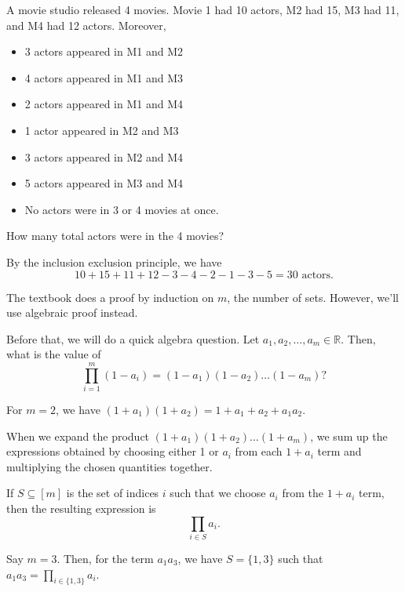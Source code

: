 
\begin{eg}
	A movie studio released 4 movies. Movie 1 had 10 actors, M2 had 15, M3 had 11, and M4 had 12 actors. Moreover, 
	\begin{itemize}
		\item 3 actors appeared in M1 and M2
		\item 4 actors appeared in M1 and M3
		\item 2 actors appeared in M1 and M4
		\item 1 actor appeared in M2 and M3
		\item 3 actors appeared in M2 and M4
		\item 5 actors appeared in M3 and M4
		\item No actors were in 3 or 4 movies at once.
	\end{itemize}
	How many total actors were in the 4 movies?\\
\end{eg}

By the inclusion exclusion principle, we have \[
	10 + 15 + 11 + 12 - 3 - 4 - 2 - 1 - 3 - 5 = 30 \text{ actors}
.\] 

\begin{note}
	The textbook does a proof by induction on \( m \), the number of sets. However, we'll use algebraic proof instead.
\end{note}

Before that, we will do a quick algebra question. Let \( a_{1},a_{2},\ldots ,a_m \in \mathbb{R} \). Then, what is the value of \[
	\prod_{i=1}^{m} (1 - a_{i}) = (1 - a_{1})(1 - a_{2})\ldots (1 - a_{m})
?\]

\begin{eg}
	For \( m=2 \), we have \( (1+a_{1})(1+a_{2})=1+a_{1}+a_{2}+a_{1}a_{2} \).
\end{eg}

When we expand the product \( (1+a_{1})(1+a_{2})\ldots (1+a_m) \), we sum up the expressions obtained by choosing either 1 or \( a_i \) from each \( 1+a_i \) term and multiplying the chosen quantities together.

If \( S \subseteq [m] \) is the set of indices \( i \) such that we choose \( a_i \) from the \( 1+a_i \) term, then the resulting expression is \[
	\prod_{i \in S} a_{i}
.\]

\begin{eg}
	Say \( m=3 \). Then, for the term \( a_{1}a_{3} \), we have \( S = \{1,3\}   \) such that \( a_{1}a_{3}=\prod_{i \in \{1,3\} } a_i\).
\end{eg}


